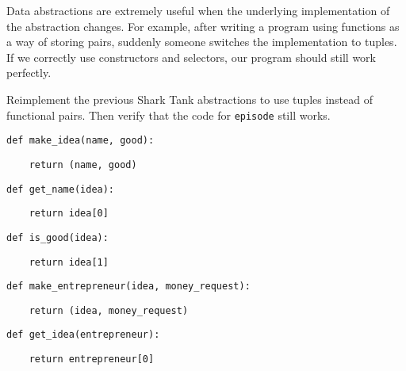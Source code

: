 \question Data abstractions are extremely useful when the underlying
implementation of the abstraction changes. For example, after writing a program
using functions as a way of storing pairs, suddenly someone switches the
implementation to tuples. If we correctly use constructors and
selectors, our program should still work perfectly.

Reimplement the previous Shark Tank abstractions to use tuples instead of functional
pairs. Then verify that the code for {\tt episode} still works.

\begin{lstlisting}
def make_idea(name, good):
\end{lstlisting}
\begin{solution}[0.5in]
\begin{lstlisting}
    return (name, good)
\end{lstlisting}
\end{solution}

\begin{lstlisting}
def get_name(idea):
\end{lstlisting}
\begin{solution}[0.5in]
\begin{lstlisting}
    return idea[0]
\end{lstlisting}
\end{solution}

\begin{lstlisting}
def is_good(idea):
\end{lstlisting}
\begin{solution}[0.5in]
\begin{lstlisting}
    return idea[1]
\end{lstlisting}
\end{solution}

\begin{lstlisting}
def make_entrepreneur(idea, money_request):
\end{lstlisting}
\begin{solution}[0.5in]
\begin{lstlisting}
    return (idea, money_request)
\end{lstlisting}
\end{solution}

\begin{lstlisting}
def get_idea(entrepreneur):
\end{lstlisting}
\begin{solution}[0.5in]
\begin{lstlisting}
    return entrepreneur[0]
\end{lstlisting}
\end{solution}

